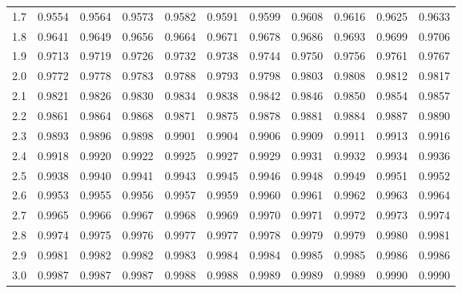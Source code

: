 \begin{tabular}{|r|rrrrrrrrrr|}
	1.7&0.9554&0.9564&0.9573&0.9582&0.9591&0.9599&0.9608&0.9616&0.9625&0.9633\\
	\rowcolor[gray]{.9}
	1.8&0.9641&0.9649&0.9656&0.9664&0.9671&0.9678&0.9686&0.9693&0.9699&0.9706\\
	1.9&0.9713&0.9719&0.9726&0.9732&0.9738&0.9744&0.9750&0.9756&0.9761&0.9767\\
	\rowcolor[gray]{.9}
	2.0&0.9772&0.9778&0.9783&0.9788&0.9793&0.9798&0.9803&0.9808&0.9812&0.9817\\
	2.1&0.9821&0.9826&0.9830&0.9834&0.9838&0.9842&0.9846&0.9850&0.9854&0.9857\\
	\rowcolor[gray]{.9}
	2.2&0.9861&0.9864&0.9868&0.9871&0.9875&0.9878&0.9881&0.9884&0.9887&0.9890\\
	2.3&0.9893&0.9896&0.9898&0.9901&0.9904&0.9906&0.9909&0.9911&0.9913&0.9916\\
	\rowcolor[gray]{.9}
	2.4&0.9918&0.9920&0.9922&0.9925&0.9927&0.9929&0.9931&0.9932&0.9934&0.9936\\
	2.5&0.9938&0.9940&0.9941&0.9943&0.9945&0.9946&0.9948&0.9949&0.9951&0.9952\\
	\rowcolor[gray]{.9}
	2.6&0.9953&0.9955&0.9956&0.9957&0.9959&0.9960&0.9961&0.9962&0.9963&0.9964\\
	2.7&0.9965&0.9966&0.9967&0.9968&0.9969&0.9970&0.9971&0.9972&0.9973&0.9974\\
	\rowcolor[gray]{.9}
	2.8&0.9974&0.9975&0.9976&0.9977&0.9977&0.9978&0.9979&0.9979&0.9980&0.9981\\
	2.9&0.9981&0.9982&0.9982&0.9983&0.9984&0.9984&0.9985&0.9985&0.9986&0.9986\\
	\rowcolor[gray]{.9}
	3.0&0.9987&0.9987&0.9987&0.9988&0.9988&0.9989&0.9989&0.9989&0.9990&0.9990\\
	\hline
\end{tabular}
